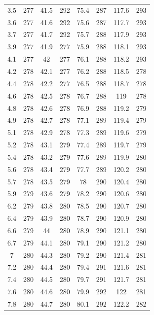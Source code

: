 \documentclass[12pt]{ctexart}
\numberwithin{equation}{section}
\begin{document}
\begin{longtable}{cc|cc|cc|cc}
3.5  &  277  &  41.5  &  292  &  75.4  &  287  &  117.6  &  293  \\
3.6  &  277  &  41.6  &  292  &  75.6  &  287  &  117.7  &  293  \\
3.7  &  277  &  41.7  &  292  &  75.7  &  288  &  117.9  &  293  \\
3.9  &  277  &  41.9  &  277  &  75.9  &  288  &  118.1  &  293  \\
4.1  &  277  &  42  &  277  &  76.1  &  288  &  118.2  &  293  \\
4.2  &  278  &  42.1  &  277  &  76.2  &  288  &  118.5  &  278  \\
4.4  &  278  &  42.2  &  277  &  76.5  &  288  &  118.7  &  278  \\
4.6  &  278  &  42.5  &  278  &  76.7  &  288  &  119  &  278  \\
4.8  &  278  &  42.6  &  278  &  76.9  &  288  &  119.2  &  279  \\
4.9  &  278  &  42.7  &  278  &  77.1  &  289  &  119.4  &  279  \\
5.1  &  278  &  42.9  &  278  &  77.3  &  289  &  119.6  &  279  \\
5.2  &  278  &  43.1  &  279  &  77.4  &  289  &  119.7  &  279  \\
5.4  &  278  &  43.2  &  279  &  77.6  &  289  &  119.9  &  280  \\
5.6  &  278  &  43.4  &  279  &  77.7  &  289  &  120.2  &  280  \\
5.7  &  278  &  43.5  &  279  &  78  &  290  &  120.4  &  280  \\
5.9  &  279  &  43.6  &  279  &  78.2  &  290  &  120.6  &  280  \\
6.2  &  279  &  43.8  &  280  &  78.5  &  290  &  120.7  &  280  \\
6.4  &  279  &  43.9  &  280  &  78.7  &  290  &  120.9  &  280  \\
6.6  &  279  &  44  &  280  &  78.9  &  290  &  121.1  &  280  \\
6.7  &  279  &  44.1  &  280  &  79.1  &  290  &  121.2  &  280  \\
7  &  280  &  44.3  &  280  &  79.2  &  290  &  121.4  &  281  \\
7.2  &  280  &  44.4  &  280  &  79.4  &  291  &  121.6  &  281  \\
7.4  &  280  &  44.5  &  280  &  79.7  &  291  &  121.7  &  281  \\
7.6  &  280  &  44.6  &  280  &  79.9  &  292  &  122  &  281  \\
7.8  &  280  &  44.7  &  280  &  80.1  &  292  &  122.2  &  282  \\

\end{longtable}
\end{document}
